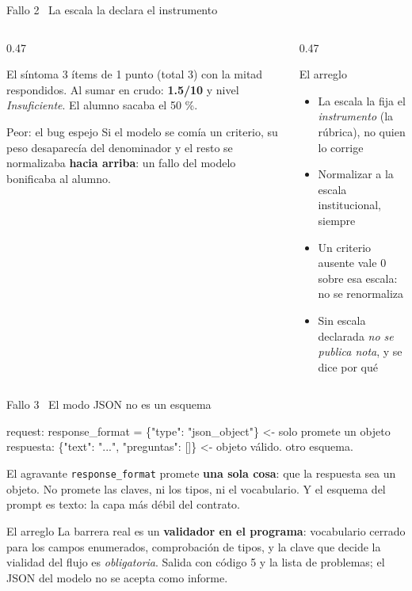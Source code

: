 \documentclass[aspectratio=169,11pt]{beamer}
\begin{document}
\begin{frame}{Fallo 2 \textbullet\ La escala la declara el instrumento}
  \begin{columns}[T]
    \begin{column}{0.47\textwidth}
      \begin{alertblock}{El síntoma}
        3 ítems de 1 punto (total 3) con la mitad respondidos. Al sumar en crudo:
        \textbf{1.5/10} y nivel \emph{Insuficiente}. El alumno sacaba el 50 \%.
      \end{alertblock}
      \begin{alertblock}{Peor: el bug espejo}
        Si el modelo se comía un criterio, su peso desaparecía del denominador
        y el resto se normalizaba \textbf{hacia arriba}: un fallo del modelo
        bonificaba al alumno.
      \end{alertblock}
    \end{column}
    \begin{column}{0.47\textwidth}
      \begin{exampleblock}{El arreglo}
        \begin{itemize}
          \item La escala la fija el \emph{instrumento} (la rúbrica), no quien
                lo corrige
          \item Normalizar a la escala institucional, siempre
          \item Un criterio ausente vale 0 sobre esa escala: no se renormaliza
          \item Sin escala declarada \emph{no se publica nota}, y se dice por qué
        \end{itemize}
      \end{exampleblock}
    \end{column}
  \end{columns}
\end{frame}

\begin{frame}{Fallo 3 \textbullet\ El modo JSON no es un esquema}
  \begin{panelMono}
request:  response\_format = \{"type": "json\_object"\}   \textcolor{codigoCadena}{<- solo promete un objeto}\\
respuesta: \{"text": "...", "preguntas": []\}          \textcolor{codigoCadena}{<- objeto válido. otro esquema.}
    \end{panelMono}
  \smallskip
  \begin{block}{El agravante}
    \texttt{response\_format} promete \textbf{una sola cosa}: que la respuesta
    sea un objeto. No promete las claves, ni los tipos, ni el vocabulario. Y el
    esquema del prompt es texto: la capa más débil del contrato.
  \end{block}
  \begin{exampleblock}{El arreglo}
    La barrera real es un \textbf{validador en el programa}: vocabulario cerrado
    para los campos enumerados, comprobación de tipos, y la clave que decide la
    vialidad del flujo es \emph{obligatoria}. Salida con código 5 y la lista de
    problemas; el JSON del modelo no se acepta como informe.
  \end{exampleblock}
\end{frame}
\end{document}
